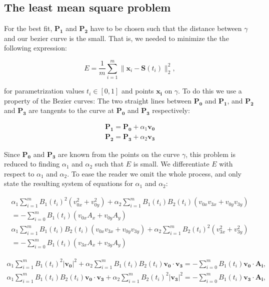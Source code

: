 \documentclass[10pt]{article}
\begin{document}
\subsection*{The least mean square problem}

For the best fit, $\mathbf{P_1}$ and $\mathbf{P_2}$ have to be chosen such that the distance between $\gamma$ and our bezier curve is the small. That is, we needed to minimize the the following expression:

\begin{equation}
E = \frac{1}{m} \sum_{i=1}^{m} \| \mathbf{x}_i - \mathbf{S}(t_i)\|^2_2,
\end{equation}

for parametrization values $t_i \in [ 0,1 ]$ and points $\mathbf{x_i}$ on $\gamma$. To do this we use a property of the Bezier curves: The two straight lines between $\mathbf{P_0}$ and $\mathbf{P_1}$, and $\mathbf{P_2}$ and $\mathbf{P_3}$ are tangents to the curve at $\mathbf{P_0}$ and $\mathbf{P_3}$ respectively:

\begin{align}
\mathbf{P_1} = \mathbf{P_0} + \alpha_1 \mathbf{v_0} \\
\mathbf{P_2} = \mathbf{P_3} + \alpha_2 \mathbf{v_3}
\end{align}

Since $\mathbf{P_0}$ and $\mathbf{P_3}$ are known from the points on the curve $\gamma$, this problem is reduced to finding $\alpha_1$ and $\alpha_2$ such that $E$ is small. We differentiate $E$ with respect to $\alpha_1$ and $\alpha_2$. To ease the reader we omit the whole process, and only state the resulting system of equations for $\alpha_1$ and $\alpha_2$:

\begin{align}
\alpha_1 \sum_{i = 1}^m B_1(t_i)^2 (v_{0x}^2 + v_{0y}^2) + \alpha_2 \sum_{i = 1}^m B_1(t_i)B_2(t_i)(v_{0x}v_{3x} + v_{0y}v_{3y}) \\
= - \sum_{i = 0}^m B_1(t_i)(v_{0x}A_x + v_{0y}A_y) \\
\alpha_1 \sum_{i = 1}^m B_1(t_i)B_2(t_i)(v_{0x}v_{3x} + v_{0y}v_{3y}) + \alpha_2 \sum_{i = 1}^m B_2(t_i)^2 (v_{3x}^2 + v_{3y}^2) \\
= - \sum_{i = 0}^m B_1(t_i)(v_{3x}A_x + v_{3y}A_y)
\end{align}

\begin{align}
\alpha_1 \sum_{i = 1}^m B_1(t_i)^2 |\mathbf{v_0}|^2 + \alpha_2 \sum_{i = 1}^m B_1(t_i)B_2(t_i)\mathbf{v_0} \cdot \mathbf{v_3} 
= - \sum_{i = 0}^m B_1(t_i) \mathbf{v_0} \cdot \mathbf{A_i}, \\
\alpha_1 \sum_{i = 1}^m B_1(t_i)B_2(t_i)\mathbf{v_0} \cdot \mathbf{v_3} + \alpha_2 \sum_{i = 1}^m B_2(t_i)^2 |\mathbf{v_3}|^2 
= - \sum_{i = 0}^m B_1(t_i)\mathbf{v_3} \cdot \mathbf{A_i},
\end{align}
\end{document}

